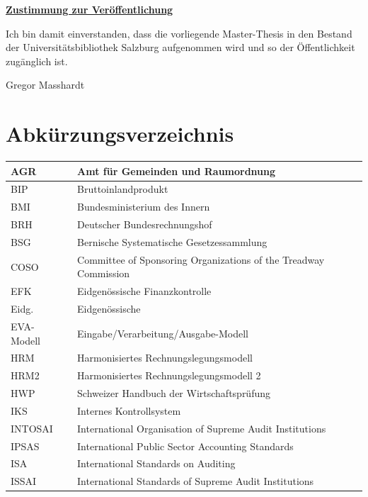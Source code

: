 \documentclass[10pt]{article}
\begin{document}
\newpage
\underline{\textbf{Zustimmung zur Veröffentlichung}}

Ich bin damit einverstanden, dass die vorliegende Master-Thesis in den Bestand der Universitätsbibliothek Salzburg aufgenommen wird und so der Öffentlichkeit zugänglich ist.

\vspace{1.6cm}
Gregor Masshardt

\newpage
\tableofcontents
\newpage
{}
\listoffigures
\newpage
\section*{Abkürzungsverzeichnis}\label{sec:abkuerzungsverzeichnis}
\begin{table}[h]
 \centering
 \begin{tabular}{|l|l|}
 \hline
 AGR~ & Amt für Gemeinden und Raumordnung~ \\
 \hline
 BIP~ & Bruttoinlandprodukt~ \\
 \hline
 BMI~ & Bundesministerium des Innern~ \\
 \hline
 BRH~ & Deutscher Bundesrechnungshof~ \\
 \hline
 BSG~ & Bernische Systematische Gesetzessammlung~ \\
 \hline
 COSO~ & Committee of Sponsoring Organizations of the Treadway Commission~ \\
 \hline
 EFK~ & Eidgenössische Finanzkontrolle~ \\
 \hline
 Eidg.~ & Eidgenössische~ \\
 \hline
 EVA-Modell~ & Eingabe/Verarbeitung/Ausgabe-Modell~ \\
 \hline
 HRM~ & Harmonisiertes Rechnungslegungsmodell~ \\
 \hline
 HRM2~ & Harmonisiertes Rechnungslegungsmodell 2~ \\
 \hline
 HWP~ & Schweizer Handbuch der Wirtschaftsprüfung~ \\
 \hline
 IKS~ & Internes Kontrollsystem~ \\
 \hline
 INTOSAI~ & International Organisation of Supreme Audit Institutions~ \\
 \hline
 IPSAS~ & International Public Sector Accounting Standards~ \\
 \hline
 ISA~ & International Standards on Auditing~ \\
 \hline
 ISSAI~ & International Standards of Supreme Audit Institutions~ \\

\end{tabular}
\end{table}
\end{document}
